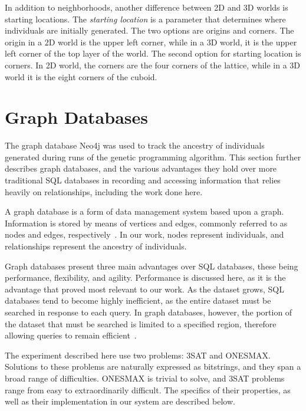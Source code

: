 \documentclass[12pt]{article}
\begin{document}
In addition to neighborhoods, another difference between 2D and 3D worlds is starting locations. The \emph{starting location} is a parameter that determines where individuals are initially generated. The two options are origins and corners. The origin in a 2D world is the upper left corner, while in a 3D world, it is the upper left corner of the top layer of the world. The second option for starting location is corners. In  2D world, the corners are the four corners of the lattice, while in a 3D world it is the eight corners of the cuboid.

\section{Graph Databases}
\label{sec:Graph Databases}

The graph database Neo4j was used to track the ancestry of individuals generated during runs of the genetic programming algorithm. This section further describes graph databases, and the various advantages they hold over more traditional SQL databases in recording and accessing information that relies heavily on relationships, including the work done here.

A graph database is a form of data management system based upon a graph. Information is stored by means of vertices and edges, commonly referred to as nodes and edges, respectively~\cite{GraphDatabases:2013}. In our work, nodes represent individuals, and relationships represent the ancestry of individuals.

Graph databases present three main advantages over SQL databases, these being performance, flexibility, and agility. Performance is discussed here, as it is the advantage that proved most relevant to our work. As the dataset grows, SQL databases tend to become highly inefficient, as the entire dataset must be searched in response to each query. In graph databases, however, the portion of the dataset that must be searched is limited to a specified region, therefore allowing queries to remain efficient~\cite{GraphDatabases:2013}.



The experiment described here use two problems: 3SAT and ONESMAX. Solutions to these problems are naturally expressed as bitstrings, and they span a broad range of difficulties. ONESMAX is trivial to solve, and 3SAT problems range from easy to extraordinarily difficult. The specifics of their properties, as well as their implementation in our system are described below.
\end{document}

